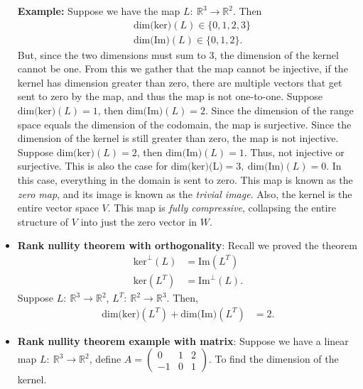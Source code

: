 \documentclass{report}
\begin{document}
\begin{itemize}
            \bigbreak \noindent 
            \textbf{Example:} Suppose we have the map $L:\ \mathbb{R}^{3} \to \mathbb{R}^{2}$. Then
            \begin{align*}
                &\text{dim(ker)}(L) \in \{0,1,2,3\} \\
                &\text{dim(Im)}(L) \in \{0,1,2\}
            .\end{align*}
            But, since the two dimensions must sum to 3, the dimension of the kernel cannot be one. From this we gather that the map cannot be injective, if the kernel has dimension greater than zero, there are multiple vectors that get sent to zero by the map, and thus the map is not one-to-one.  
            \bigbreak \noindent 
            Suppose $\text{dim(ker)}(L) = 1$, then $\text{dim(Im)}(L) = 2$. Since the dimension of the range space equals the dimension of the codomain, the map is surjective. Since the dimension of the kernel is still greater than zero, the map is not injective. 
            \bigbreak \noindent 
            Suppose $\text{dim(ker)}(L) = 2$, then $\text{dim(Im)}(L) = 1$. Thus, not injective or surjective. This is also the case for $\text{dim(ker)(L)} = 3,\ \text{dim(Im)}(L) = 0$. In this case, everything in the domain is sent to zero. This map is known as the \textit{zero map}, and its image is known as the \textit{trivial image}. Also, the kernel is the entire vector space $V$. This map is \textit{fully compressive}, collapsing the entire structure of $V$ into just the zero vector in $W$.
        \item \textbf{Rank nullity theorem with orthogonality}: Recall we proved the theorem
            \begin{align*}
                \text{ker}^{\perp}(L) &= \text{Im}(L^{T}) \\
                \text{ker}(L^{T}) &= \text{Im}^{\perp}(L)
            .\end{align*}
            \bigbreak \noindent 
            Suppose $L:\ \mathbb{R}^{3} \to \mathbb{R}^{2}$, $L^{T}:\ \mathbb{R}^{2} \to \mathbb{R}^{3}$. Then,
            \begin{align*}
                \text{dim(ker)}(L^{T}) + \text{dim(Im)}(L^{T}) &= 2 
            .\end{align*}
        \item \textbf{Rank nullity theorem example with matrix}: Suppose we have a linear map $L:\ \mathbb{R}^{3} \to \mathbb{R}^{2}$, define $A = \begin{pmatrix} 0 & 1 & 2 \\ -1 & 0 & 1\end{pmatrix} $. To find the dimension of the kernel.

\end{itemize}
\end{document}

